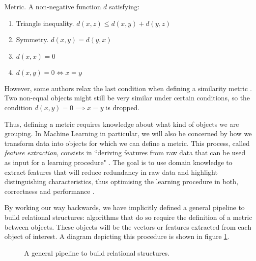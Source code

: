 \documentclass[../main.tex]{subfiles} \label{chapter_soa}
\begin{document}
\theoremstyle{definition}
\begin{definition}{Metric}.
\label{def_metric}
A non-negative function $d$ satisfying:
\begin{enumerate}
\item Triangle inequality. $d(x, z) \leq d(x, y) + d(y, z) $
\item Symmetry. $d(x, y) = d(y, x)$
\item $d(x, x) = 0$
\item $d(x, y) = 0 \iff x = y$
\end{enumerate}
\end{definition}
\par However, some authors relax the last condition when defining a similarity metric \cite{Goshtasby2012}. Two non-equal objects might still be very similar under certain conditions, so the condition $d(x, y) = 0 \implies x = y$ is dropped.
\par Thus, defining a metric requires knowledge about what kind of objects we are grouping. In Machine Learning in particular, we will also be concerned by how we transform data into objects for which we can define a metric. This process, called \emph{feature extraction}, consists in ``deriving features from raw data that can be used as input for a learning procedure" \cite{hastie2008}. The goal is to use domain knowledge to extract features that will reduce redundancy in raw data and highlight distinguishing characteristics, thus optimising the learning procedure in both, correctness and performance \cite{Bishop2006}. 
\par By working our way backwards, we have implicitly defined a general pipeline to build relational structures: algorithms that do so require the definition of a metric between objects. These objects will be the vectors or features extracted from each object of interest. A diagram depicting this procedure is shown in figure \ref{pipeline}.
\begin{figure}
\centering
{}
\caption{A general pipeline to build relational structures.}
\label{pipeline}
\end{figure}
\end{document}
